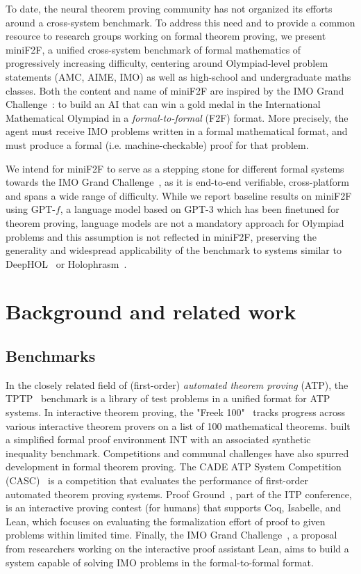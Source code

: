 To date, the neural theorem proving community has not organized its efforts around a cross-system benchmark. To address this need and to provide a common resource to research groups working on formal theorem proving, we present \textsf{miniF2F}, a unified cross-system benchmark of formal mathematics of progressively increasing difficulty, centering around Olympiad-level problem statements (AMC, AIME, IMO) as well as high-school and undergraduate maths classes. Both the content and name of \textsf{miniF2F} are inspired by the IMO Grand Challenge~\citep{imograndchallenge}: to build an AI that can win a gold medal in the International Mathematical Olympiad in a \emph{formal-to-formal} (F2F) format. More precisely, the agent must receive IMO problems written in a formal mathematical format, and must produce a formal (i.e. machine-checkable) proof for that problem.

We intend for \textsf{miniF2F} to serve as a stepping stone for different formal systems towards the IMO Grand Challenge~\citep{imograndchallenge}, as it is end-to-end verifiable, cross-platform and spans a wide range of difficulty. While we report baseline results on \textsf{miniF2F} using GPT-$f$, a language model based on GPT-3 which has been finetuned for theorem proving, language models are not a mandatory approach for Olympiad problems and this assumption is not reflected in \textsf{miniF2F}, preserving the generality and widespread applicability of the benchmark to systems similar to DeepHOL~\citep{bansal2019holist} or Holophrasm~\citep{DBLP:journals/corr/Whalen16}.

\section{Background and related work}

\subsection*{Benchmarks}
In the closely related field of (first-order) \emph{automated theorem proving} (ATP), the TPTP~\citep{Sut17TPTP} benchmark is a library of test problems in a unified format for ATP systems. In interactive theorem proving, the "Freek 100"~\citep{wiedijk2008formalizing} tracks progress across various interactive theorem provers on a list of 100 mathematical theorems. \citet{wu2020int} built a simplified formal proof environment INT with an associated synthetic inequality benchmark. Competitions and communal challenges have also spurred development in formal theorem proving. The CADE ATP System Competition (CASC)~\citep{Sut16} is a competition that evaluates the performance of first-order automated theorem proving systems. Proof Ground~\citep{proofground}, part of the ITP conference, is an interactive proving contest (for humans) that supports Coq, Isabelle, and Lean, which focuses on evaluating the formalization effort of proof to given problems within limited time. Finally, the IMO Grand Challenge~\citep{imograndchallenge}, a proposal from researchers working on the interactive proof assistant Lean, aims to build a system capable of solving IMO problems in the formal-to-formal format.

